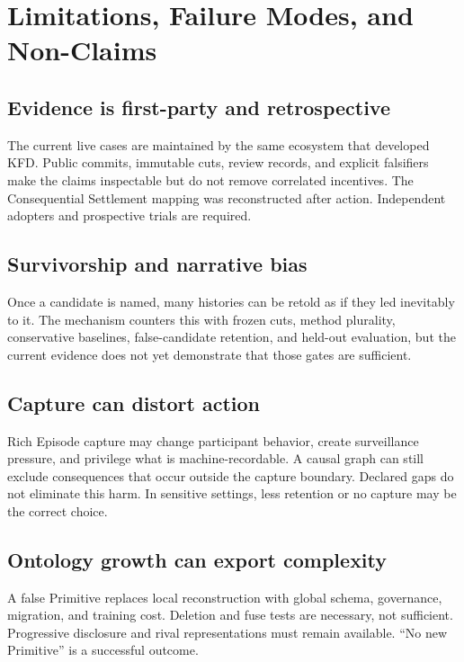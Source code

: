 \section{Limitations, Failure Modes, and Non-Claims}
\label{sec:limitations}

\subsection{Evidence is first-party and retrospective}

The current live cases are maintained by the same ecosystem that developed
KFD. Public commits, immutable cuts, review records, and explicit falsifiers
make the claims inspectable but do not remove correlated incentives. The
Consequential Settlement mapping was reconstructed after action. Independent
adopters and prospective trials are required.

\subsection{Survivorship and narrative bias}

Once a candidate is named, many histories can be retold as if they led
inevitably to it. The mechanism counters this with frozen cuts, method
plurality, conservative baselines, false-candidate retention, and held-out
evaluation, but the current evidence does not yet demonstrate that those gates
are sufficient.

\subsection{Capture can distort action}

Rich Episode capture may change participant behavior, create surveillance
pressure, and privilege what is machine-recordable. A causal graph can still
exclude consequences that occur outside the capture boundary. Declared gaps do
not eliminate this harm. In sensitive settings, less retention or no capture
may be the correct choice.

\subsection{Ontology growth can export complexity}

A false Primitive replaces local reconstruction with global schema,
governance, migration, and training cost. Deletion and fuse tests are
necessary, not sufficient. Progressive disclosure and rival representations
must remain available. ``No new Primitive'' is a successful outcome.

